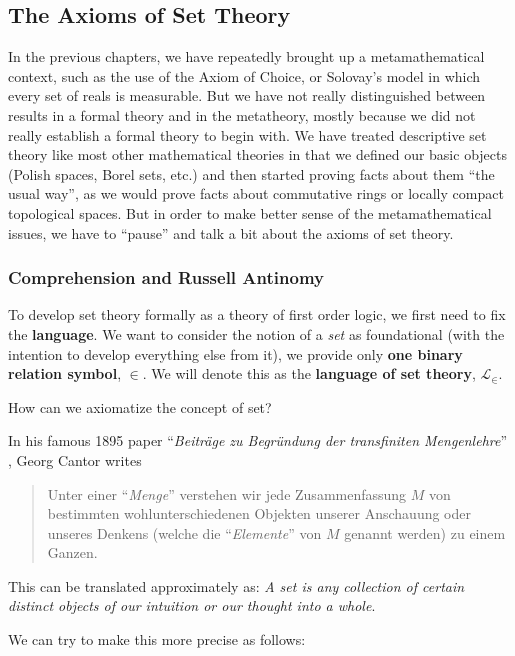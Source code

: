 \subsection{The Axioms of Set Theory}

In the previous chapters, we have repeatedly brought up a metamathematical context, such as the use of the Axiom of Choice, or Solovay's model in which every set of reals is measurable. But we have not really distinguished between results in a formal theory and in the metatheory, mostly because we did not really establish a formal theory to begin with. We have treated descriptive set theory like most other mathematical theories in that we defined our basic objects (Polish spaces, Borel sets, etc.) and then started proving facts about them ``the usual way'', as we would prove facts about commutative rings or locally compact topological spaces. But in order to make better sense of the metamathematical issues, we have to ``pause'' and talk a bit about the axioms of set theory.

\subsubsection{Comprehension and Russell Antinomy}

To develop set theory formally as a theory of first order logic, we first need to fix the \textbf{language}. We want to consider the notion of a \textit{set} as foundational (with the intention to develop everything else from it), we provide only \textbf{one binary relation symbol}, $\in$. We will denote this as the \textbf{language of set theory}, $\mathcal{L}_\in$.

How can we axiomatize the concept of set?

In his famous 1895 paper ``\textit{Beiträge zu Begründung der transfiniten Mengenlehre}'' \cite{Cantor_1895s}, Georg Cantor writes

\begin{quote}
Unter einer ``\textit{Menge}'' verstehen wir jede Zusammenfassung $M$ von bestimmten wohlunterschiedenen Objekten unserer Anschauung oder unseres Denkens (welche die ``\textit{Elemente}'' von  $M$  genannt werden)  zu einem Ganzen.
\end{quote}

This can be translated approximately as: \textit{A set is any collection of certain distinct objects of our intuition or our thought into a whole}.

We can try to make this more precise as follows:

